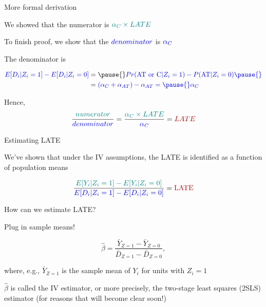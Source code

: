 \documentclass[11pt,english,handout]{beamer}
\newenvironment{wideitemize}{\itemize\addtolength{\itemsep}{10pt}}{\enditemize}
\begin{document}
\begin{frame}{More formal derivation}

\begin{wideitemize}
	\item
	We showed that the {\color{teal} numerator} is $\color{teal} \alpha_C \times LATE$
	
	\item
	To finish proof, we show that the $\color{blue} denominator$ is $\color{blue} \alpha_C$
	
	\pause
	\item
	The denominator is 
	
	\begin{align*}
		\color{blue} E[D_i | Z_i = 1] - E[D_i | Z_i = 0] &= \pause{}  \color{blue} Pr(\text{AT or C} | Z_i = 1) - P(\text{AT} | Z_i = 0)  \pause{} \\
		& = \color{blue}  (\alpha_C + \alpha_{AT}) - \alpha_{AT} = \pause{}  \color{blue}  \alpha_C
	\end{align*} 


	\pause
	Hence, $$\dfrac{\color{teal} numerator}{ \color{blue}  denominator }	= \dfrac{\color{teal} \alpha_C \times LATE}{ \color{blue}  \alpha_C } = \color{red} LATE$$
\end{wideitemize}	
	
\end{frame}


\begin{frame}{Estimating LATE}
	
	\begin{wideitemize}
		\item
		We've shown that under the IV assumptions, the LATE is identified as a function of population means
		
		$$ \dfrac{ \color{teal} E[Y_i | Z_i = 1] - E[Y_i | Z_i = 0 ]  }{  \color{blue} E[D_i | Z_i = 1] - E[D_i | Z_i = 0 ]   }  = {\color{red} \text{LATE}} $$
		
		
		\item
		How can we estimate LATE? 
		
		\pause
		\item
		Plug in sample means!
		
		$$\hat\beta =  \dfrac{  \bar{Y}_{Z=1} - \bar{Y}_{Z=0}   }{ \bar{D}_{Z=1} - \bar{D}_{Z=0} } , $$
		
		\noindent where, e.g., $\bar{Y}_{Z=1}$ is the sample mean of $Y_i$ for units with $Z_i = 1$
		
		
		\pause
		\item
		$\hat\beta$ is called the IV estimator, or more precisely, the two-stage least squares (2SLS) estimator (for reasons that will become clear soon!)
	\end{wideitemize}
\end{frame}
\end{document}
